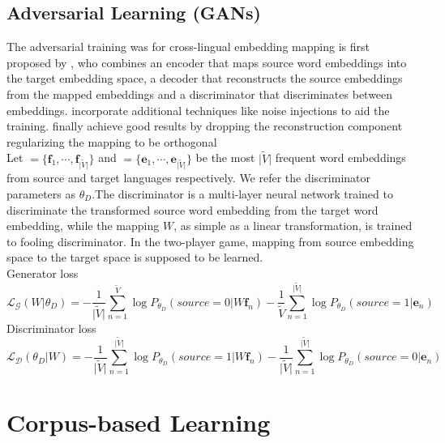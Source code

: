 \subsection{Adversarial Learning (GANs)}
The adversarial training was for cross-lingual embedding mapping is first proposed by \cite{barone2016towards}, who combines an encoder that maps source word embeddings into the target embedding space, a decoder that reconstructs the source embeddings from the mapped embeddings and a discriminator that discriminates between embeddings. \cite{zhang2017adversarial} incorporate additional techniques like noise injections to aid the training. \cite{conneau2017word} finally achieve good results by dropping the reconstruction component regularizing the mapping to be orthogonal\\
Let ${=\{ \bm{f}_1, \cdots, \bm{f}_{{\lvert \tilde{V} \rvert}}\}}$ and ${ = \{ \bm{e}_1, \cdots , \bm{e}_{{\lvert \tilde{V} \rvert}}\}}$ be the most ${\lvert \tilde{V} \rvert}$ frequent word embeddings from source and target languages respectively. We refer the discriminator parameters as ${\theta_D}$.The discriminator is a multi-layer neural network trained to discriminate the transformed source word embedding from the target word embedding, while the mapping $W$, as simple as a linear transformation, is trained to fooling discriminator. In the two-player game, mapping from source embedding space to the target space is supposed to be learned.\\

Generator loss 
\[ \mathcal{L_G}(W|\theta_D) =  -\frac{1}{{\lvert \tilde{V} \rvert}} \sum_{n=1}^{\tilde{V}}\log P_{\theta_D}(source=0|W \bm{f}_n) - \frac{1}{\tilde{V}} \sum_{n=1}^{{\lvert \tilde{V} \rvert}} \log P_{\theta_D}(source = 1 | \bm{e}_n) \]
Discriminator loss
\[ \mathcal{L_D}(\theta_D | W) =  -\frac{1}{{\lvert \tilde{V} \rvert}} \sum_{n=1}^{{\lvert \tilde{V} \rvert}} \log P_{\theta_D}(source = 1| W\bm{f}_n) - \frac{1}{{\lvert \tilde{V} \rvert}} \sum_{n=1}^{{\lvert \tilde{V} \rvert}} \log P_{\theta_D}(source=0| \bm{e}_n) \]	 
\section{Corpus-based Learning}
